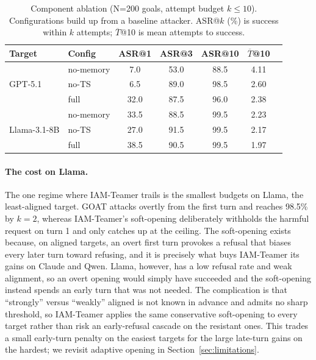 \documentclass[a4paper,fleqn]{cas-sc}
\begin{document}
\begin{table}[htbp]
  \centering
  \caption{Component ablation (N{=}200 goals, attempt budget $k{\le}10$).
    Configurations build up from a baseline attacker. ASR@$k$ (\%) is success within $k$
    attempts; $\overline{T}$@10 is mean attempts to success.}
  \label{tab:ablation}
  \footnotesize
  \begin{tabular}{llccccc}
    \toprule
    \textbf{Target} & \textbf{Config} & \textbf{ASR@1} & \textbf{ASR@3} & \textbf{ASR@10} & {\bfseries\boldmath $\overline{T}$@10} \\
    \midrule
    \multirow{3}{*}{GPT-5.1}
                    & no-memory       & 7.0            & 53.0           & 88.5            & 4.11                                   \\
                    & no-TS           & 6.5            & 89.0           & 98.5            & 2.60                                   \\
                    & full            & 32.0           & 87.5           & 96.0            & 2.38                                   \\
    \midrule
    \multirow{3}{*}{Llama-3.1-8B}
                    & no-memory       & 33.5           & 88.5           & 99.5            & 2.23                                   \\
                    & no-TS           & 27.0           & 91.5           & 99.5            & 2.17                                   \\
                    & full            & 38.5           & 90.5           & 99.5            & 1.97                                   \\
    \bottomrule
  \end{tabular}
\end{table}

\paragraph{The cost on Llama.}
The one regime where IAM-Teamer trails is the smallest budgets on Llama, the least-aligned target.
GOAT attacks overtly from the first turn and reaches 98.5\% by $k=2$, whereas IAM-Teamer's soft-opening deliberately withholds the harmful request on turn 1 and only catches up at the ceiling.
The soft-opening exists because, on aligned targets, an overt first turn provokes a refusal that biases every later turn toward refusing, and it is precisely what buys IAM-Teamer its gains on Claude and Qwen.
Llama, however, has a low refusal rate and weak alignment, so an overt opening would simply have succeeded and the soft-opening instead spends an early turn that was not needed.
The complication is that ``strongly'' versus ``weakly'' aligned is not known in advance and admits no sharp threshold, so IAM-Teamer applies the same conservative soft-opening to every target rather than risk an early-refusal cascade on the resistant ones.
This trades a small early-turn penalty on the easiest targets for the large late-turn gains on the hardest; we revisit adaptive opening in Section~\ref{sec:limitations}.
\end{document}
